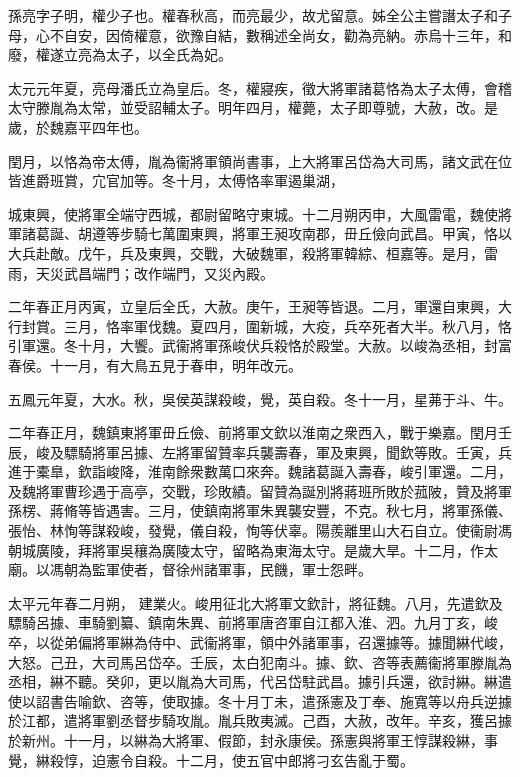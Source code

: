 \begin{pinyinscope}
 
 
 孫亮字子明，權少子也。權春秋高，而亮最少，故尤留意。姊全公主嘗譖太子和子母，心不自安，因倚權意，欲豫自結，數稱述全尚女，勸為亮納。赤烏十三年，和廢，權遂立亮為太子，以全氏為妃。
 
 
 
 
 太元元年夏，亮母潘氏立為皇后。冬，權寢疾，徵大將軍諸葛恪為太子太傅，會稽太守滕胤為太常，並受詔輔太子。明年四月，權薨，太子即尊號，大赦，改。是歲，於魏嘉平四年也。
 
 
 
 
 閏月，以恪為帝太傅，胤為衞將軍領尚書事，上大將軍呂岱為大司馬，諸文武在位皆進爵班賞，宂官加等。冬十月，太傅恪率軍遏巢湖，
 
 
 城東興，使將軍全端守西城，都尉留略守東城。十二月朔丙申，大風雷電，魏使將軍諸葛誕、胡遵等步騎七萬圍東興，將軍王昶攻南郡，毌丘儉向武昌。甲寅，恪以大兵赴敵。戊午，兵及東興，交戰，大破魏軍，殺將軍韓綜、桓嘉等。是月，雷雨，天災武昌端門；改作端門，又災內殿。
 
 
 
 
 二年春正月丙寅，立皇后全氏，大赦。庚午，王昶等皆退。二月，軍還自東興，大行封賞。三月，恪率軍伐魏。夏四月，圍新城，大疫，兵卒死者大半。秋八月，恪引軍還。冬十月，大饗。武衞將軍孫峻伏兵殺恪於殿堂。大赦。以峻為丞相，封富春侯。十一月，有大鳥五見于春申，明年改元。
 
 
五鳳元年夏，大水。秋，吳侯英謀殺峻，覺，英自殺。冬十一月，星茀于斗、牛。
 
 
 
 
 二年春正月，魏鎮東將軍毌丘儉、前將軍文欽以淮南之衆西入，戰于樂嘉。閏月壬辰，峻及驃騎將軍呂據、左將軍留贊率兵襲壽春，軍及東興，聞欽等敗。壬寅，兵進于橐臯，欽詣峻降，淮南餘衆數萬口來奔。魏諸葛誕入壽春，峻引軍還。二月，及魏將軍曹珍遇于高亭，交戰，珍敗績。留贊為誕別將蔣班所敗於菰陂，贊及將軍孫楞、蔣脩等皆遇害。三月，使鎮南將軍朱異襲安豐，不克。秋七月，將軍孫儀、張怡、林恂等謀殺峻，發覺，儀自殺，恂等伏辜。陽羨離里山大石自立。使衞尉馮朝城廣陵，拜將軍吳穰為廣陵太守，留略為東海太守。是歲大旱。十二月，作太廟。以馮朝為監軍使者，督徐州諸軍事，民饑，軍士怨畔。
 
 
太平元年春二月朔，
 建業火。峻用征北大將軍文欽計，將征魏。八月，先遣欽及驃騎呂據、車騎劉纂、鎮南朱異、前將軍唐咨軍自江都入淮、泗。九月丁亥，峻卒，以從弟偏將軍綝為侍中、武衞將軍，領中外諸軍事，召還據等。據聞綝代峻，大怒。己丑，大司馬呂岱卒。壬辰，太白犯南斗。據、欽、咨等表薦衞將軍滕胤為丞相，綝不聽。癸卯，更以胤為大司馬，代呂岱駐武昌。據引兵還，欲討綝。綝遣使以詔書告喻欽、咨等，使取據。冬十月丁未，遣孫憲及丁奉、施寬等以舟兵逆據於江都，遣將軍劉丞督步騎攻胤。胤兵敗夷滅。己酉，大赦，改年。辛亥，獲呂據於新州。十一月，以綝為大將軍、假節，封永康侯。孫憲與將軍王惇謀殺綝，事覺，綝殺惇，迫憲令自殺。十二月，使五官中郎將刁玄告亂于蜀。
 

\end{pinyinscope}
